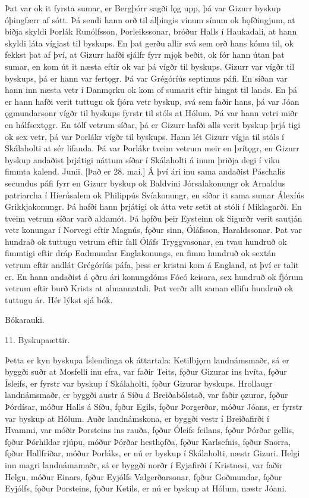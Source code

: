 Þat var ok it fyrsta sumar, er Bergþórr sagði lǫg upp, þá var Gizurr byskup óþingfærr af sótt. Þá sendi hann orð til alþingis vinum sínum ok hǫfðingjum, at biðja skyldi Þorlák Runólfsson, Þorleikssonar, bróður Halls í Haukadali, at hann skyldi láta vígjast til byskups. En þat gerðu allir svá sem orð hans kómu til, ok fekkst þat af því, at Gizurr hafði sjálfr fyrr mjǫk beðit, ok fór hann útan þat sumar, en kom út it næsta eftir ok var þá vígðr til byskups.
Gizurr var vígðr til byskups, þá er hann var fertǫgr. Þá var Grégóríús septimus páfi. En síðan var hann inn næsta vetr í Danmǫrku ok kom of sumarit eftir hingat til lands. En þá er hann hafði verit tuttugu ok fjóra vetr byskup, svá sem faðir hans, þá var Jóan ǫgmundarsonr vígðr til byskups fyrstr til stóls at Hólum. Þá var hann vetri miðr en hálfsextǫgr. En tólf vetrum síðar, þá er Gizurr hafði alls verit byskup þrjá tigi ok sex vetr, þá var Þorlákr vígðr til byskups. Hann lét Gizurr vígja til stóls í Skálaholti at sér lifanda. Þá var Þorlákr tveim vetrum meir en þrítǫgr, en Gizurr byskup andaðist þrjátigi náttum síðar í Skálaholti á inum þriðja degi í viku fimmta kalend. Junii. [Það er 28. mai.]
Á því ári inu sama andaðist Páschalis secundus páfi fyrr en Gizurr byskup ok Baldvini Jórsalakonungr ok Arnaldus patriarcha í Híerúsalem ok Philippús Svíakonungr, en síðar it sama sumar Álexíús Grikkjakonungr. Þá hafði hann þrjátigi ok átta vetr setit at stóli í Miklagarði. En tveim vetrum síðar varð aldamót. Þá hǫfðu þeir Eysteinn ok Sigurðr verit sautján vetr konungar í Norvegi eftir Magnús, fǫður sinn, Óláfsson, Haraldssonar. Þat var hundrað ok tuttugu vetrum eftir fall Óláfs Tryggvasonar, en tvau hundruð ok fimmtigi eftir dráp Eadmundar Englakonungs, en fimm hundruð ok sextán vetrum eftir andlát Grégóríús páfa, þess er kristni kom á England, at því er talit er. En hann andaðist á ǫðru ári konungdóms Fócó keisara, sex hundruð ok fjórum vetrum eftir burð Krists at almannatali. Þat verðr allt saman ellifu hundruð ok tuttugu ár.
Hér lýkst sjá bók.

Bókarauki.

11. Byskupaættir.

Þetta er kyn byskupa Íslendinga ok áttartala:
Ketilbjǫrn landnámsmaðr, sá er byggði suðr at Mosfelli inu efra, var faðir Teits, fǫður Gizurar ins hvíta, fǫður Ísleifs, er fyrstr var byskup í Skálaholti, fǫður Gizurar byskups.    Hrollaugr landnámsmaðr, er byggði austr á Síðu á Breiðabólstað, var faðir ǫzurar, fǫður Þórdísar, móður Halls á Síðu, fǫður Egils, fǫður Þorgerðar, móður Jóans, er fyrstr var byskup at Hólum.
Auðr landnámskona, er byggði vestr í Breiðafirði í Hvammi, var móðir Þorsteins ins rauða, fǫður Óleifs feilans, fǫður Þórðar gellis, fǫður Þórhildar rjúpu, móður Þórðar hesthǫfða, fǫður Karlsefnis, fǫður Snorra, fǫður Hallfríðar, móður Þorláks, er nú er byskup í Skálaholti, næstr Gizuri.
Helgi inn magri landnámamaðr, sá er byggði norðr í Eyjafirði í Kristnesi, var faðir Helgu, móður Einars, fǫður Eyjólfs Valgerðarsonar, fǫður Goðmundar, fǫður Eyjólfs, fǫður Þorsteins, fǫður Ketils, er nú er byskup at Hólum, næstr Jóani.


